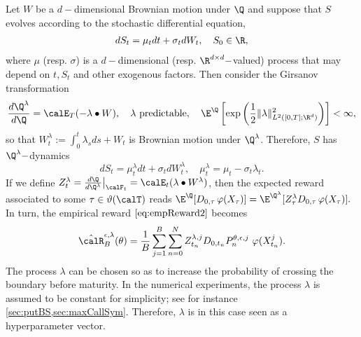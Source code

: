 Let $W$ be a $d-$dimensional Brownian motion under $\Q$ and suppose that $S$ evolves according to the stochastic differential equation, 
\begin{align}\label{eq:stockSDE}
    dS_t = \mu_t dt + \sigma_t dW_t, \quad S_0 \in \R,
\end{align}
where $\mu$ (resp. $\sigma$) is a  $d-$dimensional  (resp. $\R^{d\times d}-$valued) process that may depend on $t,S_t$ and other exogenous factors. 
Then consider the Girsanov transformation 
\begin{equation}\label{eq:Girsanov}
\frac{d\Q^{\lambda}}{d\Q} = \calE_T(- \lambda \bullet W), \quad \lambda  \text{ predictable},\quad   \E^{\Q}\left[\exp\left(\frac{1}{2}\lVert \lambda\rVert^2_{L^2([0,T];\R^d)}\right)\right] <\infty, 
\end{equation}%
so that 
$W_t^{\lambda} :=  \int_0^{t}\lambda_s ds + W_t$ is Brownian motion under $\Q^{\lambda}$. Therefore, $S$ has $\Q^{\lambda}-$dynamics
\begin{equation}
    dS_t = \mu^{\lambda}_t dt + \sigma_t dW^{\lambda}_t,\quad \mu^{\lambda}_t = \mu_t - \sigma_t \lambda_t. 
\end{equation}
If we define $Z^{\lambda}_t = \frac{d\Q}{d\Q^{\lambda}} \big |_{\calF_t}  = \calE_t(\lambda \bullet W^{\lambda})$, then the expected reward associated to some $\tau \in \vartheta(\calT)$ reads  $\E^{\Q}[D_{0,\tau}\, \varphi(X_{\tau})] =  \E^{\Q^{\lambda}}[Z^{\lambda}_{\tau}D_{0,\tau}\, \varphi(X_{\tau})]. $ %
In turn, 
the empirical reward $\eqref{eq:empReward2}$ becomes 
\begin{equation}\label{eq:empReward3}
\hat{\calR}_B^{\epsilon,\lambda}(\theta) =  \frac{1}{B}\sum_{j=1}^B  \sum_{n=0}^N Z^{\lambda,j}_{t_n} D_{0,t_n}   P^{\theta,\epsilon,j}_{n}\ \varphi(X_{t_n}^j).
\end{equation}
The process $\lambda$ can be chosen so as to increase the probability of crossing the boundary before maturity. In the numerical experiments, the process $\lambda$ is assumed to be constant for simplicity; see for instance  \cref{sec:putBS,sec:maxCallSym}. Therefore, $\lambda$ is in this case seen as a hyperparameter vector. %


